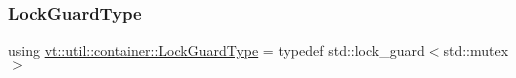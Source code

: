 \mbox{\label{namespacevt_1_1util_1_1container_a3a15245f8cecaa98c5761db2ccfa7301}} 
\subsubsection{\texorpdfstring{Lock\+Guard\+Type}{LockGuardType}}
{\footnotesize\ttfamily using \hyperlink{namespacevt_1_1util_1_1container_a3a15245f8cecaa98c5761db2ccfa7301}{vt\+::util\+::container\+::\+Lock\+Guard\+Type} = typedef std\+::lock\+\_\+guard$<$std\+::mutex$>$}

